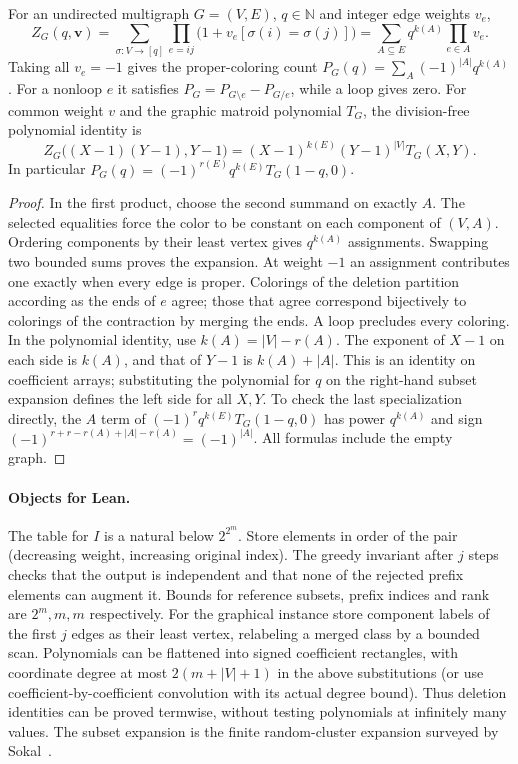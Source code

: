 \begin{theorem}\label{result53}
For an undirected multigraph $G=(V,E)$, $q\in\mathbb N$ and integer edge weights $v_e$,
\[
 Z_G(q,\mathbf v)=\sum_{\sigma:V\to[q]}\prod_{e=ij}\bigl(1+v_e[\sigma(i)=\sigma(j)]\bigr)
 =\sum_{A\subseteq E}q^{k(A)}\prod_{e\in A}v_e.
\]
Taking all $v_e=-1$ gives the proper-coloring count $P_G(q)=\sum_A(-1)^{|A|}q^{k(A)}$. For a nonloop $e$ it satisfies $P_G=P_{G\setminus e}-P_{G/e}$, while a loop gives zero. For common weight $v$ and the graphic matroid polynomial $T_G$, the division-free polynomial identity is
\[
 Z_G\bigl((X-1)(Y-1),Y-1\bigr)
   =(X-1)^{k(E)}(Y-1)^{|V|}T_G(X,Y).
\]
In particular $P_G(q)=(-1)^{r(E)}q^{k(E)}T_G(1-q,0)$.
\end{theorem}
\begin{proof}
In the first product, choose the second summand on exactly $A$. The selected equalities force the color to be constant on each component of $(V,A)$. Ordering components by their least vertex gives $q^{k(A)}$ assignments. Swapping two bounded sums proves the expansion. At weight $-1$ an assignment contributes one exactly when every edge is proper. Colorings of the deletion partition according as the ends of $e$ agree; those that agree correspond bijectively to colorings of the contraction by merging the ends. A loop precludes every coloring. In the polynomial identity, use $k(A)=|V|-r(A)$. The exponent of $X-1$ on each side is $k(A)$, and that of $Y-1$ is $k(A)+|A|$. This is an identity on coefficient arrays; substituting the polynomial for $q$ on the right-hand subset expansion defines the left side for all $X,Y$. To check the last specialization directly, the $A$ term of $(-1)^r q^{k(E)}T_G(1-q,0)$ has power $q^{k(A)}$ and sign $(-1)^{r+r-r(A)+|A|-r(A)}=(-1)^{|A|}$. All formulas include the empty graph.
\end{proof}

\paragraph{Objects for Lean.} The table for $I$ is a natural below $2^{2^m}$. Store elements in order of the pair (decreasing weight, increasing original index). The greedy invariant after $j$ steps checks that the output is independent and that none of the rejected prefix elements can augment it. Bounds for reference subsets, prefix indices and rank are $2^m,m,m$ respectively. For the graphical instance store component labels of the first $j$ edges as their least vertex, relabeling a merged class by a bounded scan. Polynomials can be flattened into signed coefficient rectangles, with coordinate degree at most $2(m+|V|+1)$ in the above substitutions (or use coefficient-by-coefficient convolution with its actual degree bound). Thus deletion identities can be proved termwise, without testing polynomials at infinitely many values. The subset expansion is the finite random-cluster expansion surveyed by Sokal~\cite{sokal}.
